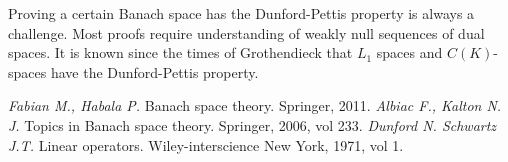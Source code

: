 \documentclass[12pt]{article}
\begin{document}
Proving a certain Banach space has the Dunford-Pettis property is always a challenge. Most proofs require understanding of weakly null sequences of dual spaces. It is known since the times of Grothendieck that $L_1$ spaces and $C(K)$-spaces have the Dunford-Pettis property.

\newpage
\begin{thebibliography}{999}
\textit{Fabian M., Habala P.} Banach space theory. Springer, 2011.
\textit{Albiac F., Kalton N. J.} Topics in Banach space theory. Springer, 2006, vol 233.
\textit{Dunford N. Schwartz J.T.} Linear operators. Wiley-interscience New York, 1971, vol 1.
\end{thebibliography}
\end{document}
